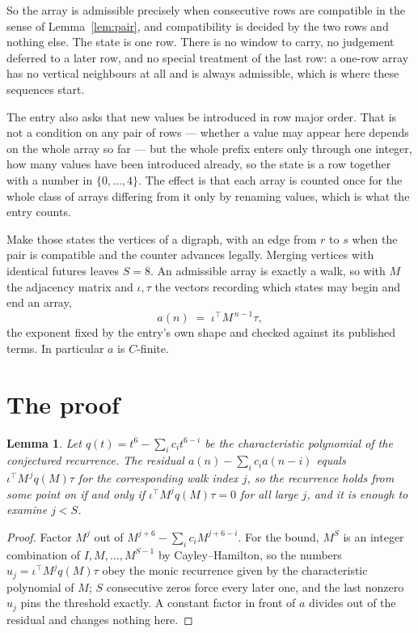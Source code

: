 \documentclass[11pt,a4paper]{article}
\theoremstyle{plain}
\newtheorem{lemma}[theorem]{Lemma}
\theoremstyle{definition}
\begin{document}
So the array is admissible precisely when consecutive rows are compatible in the sense of Lemma~\ref{lem:pair}, and compatibility is decided by the two rows and nothing else. The state is one row. There is no window to carry, no judgement deferred to a later row, and no special treatment of the last row: a one-row array has no vertical neighbours at all and is always admissible, which is where these sequences start.

The entry also asks that new values be introduced in row major order. That is not a condition on any pair of rows --- whether a value may appear here depends on the whole array so far --- but the whole prefix enters only through one integer, how many values have been introduced already, so the state is a row together with a number in $\{0,\dots,4\}$. The effect is that each array is counted once for the whole class of arrays differing from it only by renaming values, which is what the entry counts.

Make those states the vertices of a digraph, with an edge from $r$ to $s$ when the pair is compatible and the counter advances legally. Merging vertices with identical futures leaves $S=8$. An admissible array is exactly a walk, so with $M$ the adjacency matrix and $\iota,\tau$ the vectors recording which states may begin and end an array,
\[
a(n)\;=\;\iota^{\!\top}M^{\,n-1}\tau ,
\]
the exponent fixed by the entry's own shape and checked against its published terms. In
particular $a$ is $C$-finite.

\section{The proof}

\begin{lemma}\label{lem:crit}
Let $q(t)=t^{6}-\sum_i c_it^{6-i}$ be the characteristic polynomial of the
conjectured recurrence. The residual $a(n)-\sum_ic_ia(n-i)$ equals
$\iota^{\!\top}M^{\,j}q(M)\tau$ for the corresponding walk index $j$, so the recurrence
holds from some point on if and only if $\iota^{\!\top}M^{j}q(M)\tau=0$ for all large $j$,
and it is enough to examine $j<S$.
\end{lemma}

\begin{proof}
Factor $M^{j}$ out of $M^{j+6}-\sum_ic_iM^{j+6-i}$. For the bound, $M^{S}$
is an integer combination of $I,M,\dots,M^{S-1}$ by Cayley--Hamilton, so the numbers
$u_j=\iota^{\!\top}M^{j}q(M)\tau$ obey the monic recurrence given by the characteristic
polynomial of $M$; $S$ consecutive zeros force every later one, and the last nonzero $u_j$
pins the threshold exactly. A constant factor in front of $a$ divides out of the residual and
changes nothing here.
\end{proof}
\end{document}
